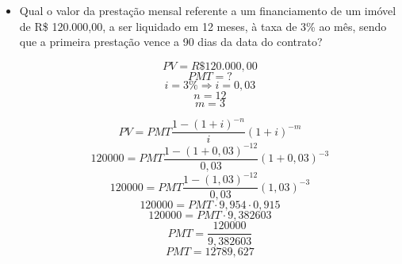 \documentclass[a4paper, 12pt]{article}
\begin{document}
\begin{itemize}
\item Qual o valor da prestação mensal referente a um financiamento de um imóvel de R\$ 120.000,00, a ser liquidado em 12 meses, à taxa de 3\% ao mês, sendo que a primeira prestação vence a 90 dias da data do contrato?

$$ PV = R\$120.000,00 $$
$$ PMT = ? $$  
$$ i = 3\% \Rightarrow i = 0,03 $$
$$ n = 12 $$
$$ m = 3 $$  

$$ PV = PMT\frac{1-(1+i)^{-n}}{i}(1+i)^{-m} $$
$$ 120000 = PMT\frac{1-(1+0,03)^{-12}}{0,03}(1+0,03)^{-3} $$
$$ 120000 = PMT\frac{1-(1,03)^{-12}}{0,03}(1,03)^{-3} $$
$$ 120000 = PMT \cdot 9,954 \cdot 0,915 $$
$$ 120000 = PMT \cdot 9,382603 $$
$$ PMT = \frac{120000}{9,382603} $$
$$ \boxed{PMT = 12789,627} $$        



\end{itemize}
\end{document}
